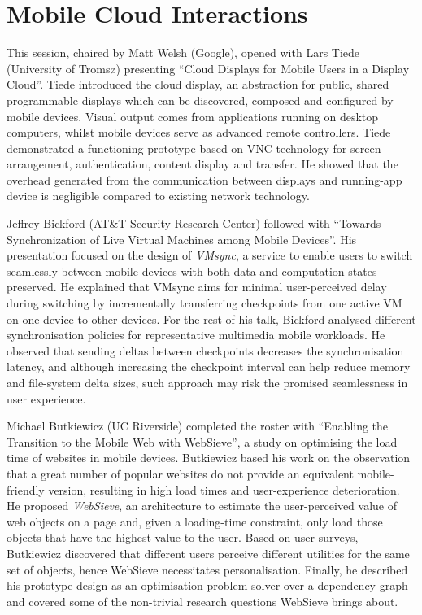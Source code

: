 \section{Mobile Cloud Interactions}
\label{sec:mobilecloud}

This session, chaired by Matt Welsh (Google), opened with Lars Tiede
(University of Tromsø) presenting ``Cloud Displays for Mobile Users in a
Display Cloud''. Tiede introduced the cloud display, an abstraction for
public, shared programmable displays which can be discovered, composed
and configured by mobile devices. Visual output comes from
applications running on desktop computers, whilst mobile devices serve as
advanced remote controllers. Tiede demonstrated a functioning
prototype based on VNC technology for screen arrangement,
authentication, content display and transfer. He showed that the
overhead generated from the communication between displays and
running-app device is negligible compared to existing network
technology.

Jeffrey Bickford (AT\&T Security Research Center) followed with
``Towards Synchronization of Live Virtual Machines among Mobile
Devices''. His presentation focused on the design of \emph{VMsync}, a
service to enable users to switch seamlessly between mobile devices
with both data and computation states preserved. He explained that VMsync
aims for minimal user-perceived delay during switching by incrementally
transferring checkpoints from one active VM on one device to other
devices. For the rest of his talk, Bickford analysed different
synchronisation policies for representative multimedia mobile workloads.
He observed that sending deltas between checkpoints decreases the
synchronisation latency, and although increasing the checkpoint interval
can help reduce memory and file-system delta sizes, such approach may
risk the promised seamlessness in user experience.

Michael Butkiewicz (UC Riverside) completed the roster with ``Enabling
the Transition to the Mobile Web with WebSieve'', a study on optimising
the load time of websites in mobile devices. Butkiewicz based his work
on the observation that a great number of popular websites do
not provide an equivalent mobile-friendly version, resulting in high
load times and user-experience deterioration. He proposed
\emph{WebSieve}, an architecture to estimate the user-perceived value of
web objects on a page and, given a loading-time constraint, only load 
those objects that have the highest value to the user. Based on user
surveys, Butkiewicz discovered that different users perceive different
utilities for the same set of objects, hence WebSieve necessitates
personalisation.  Finally, he described his prototype design as an
optimisation-problem solver over a dependency graph and covered
some of the non-trivial research questions WebSieve brings about.

